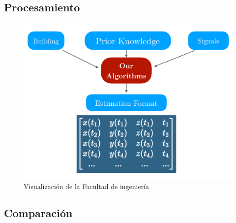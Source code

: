 \subsection{Procesamiento}
\begin{figure}
    \includegraphics[width=1.0\columnwidth]{img/Design/5.pdf}
    \caption[]{Visualización de la Facultad de ingeniería}
\end{figure}
\subsection{Comparación}